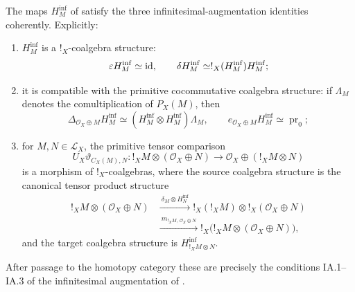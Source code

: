 \begin{proposition}
\label{prop:tangent-infinitesimal-augmentation-identities}
The maps \(H^{\inf}_M\) of
 satisfy the three
infinitesimal-augmentation identities coherently. Explicitly:
\begin{enumerate}[label=(\roman*)]
    \item \(H^{\inf}_M\) is a \(!_X\)-coalgebra structure:
    \[
        \varepsilon H^{\inf}_M\simeq\operatorname{id},
        \qquad
        \delta H^{\inf}_M
        \simeq
        !_X(H^{\inf}_M)H^{\inf}_M;
    \]

    \item it is compatible with the primitive cocommutative coalgebra structure:
    if \(\Lambda_M\) denotes the comultiplication of \(P_X(M)\), then
    \[
        \Delta_{\mathcal O_X\oplus M}H^{\inf}_M
        \simeq
        (H^{\inf}_M\otimes H^{\inf}_M)\Lambda_M,
        \qquad
        e_{\mathcal O_X\oplus M}H^{\inf}_M\simeq\operatorname{pr}_0;
    \]

    \item for \(M,N\in\mathcal L_X\), the primitive tensor comparison
    \[
        U_X\vartheta_{C_X(M),N}:
        !_XM\otimes(\mathcal O_X\oplus N)
        \longrightarrow
        \mathcal O_X\oplus(!_XM\otimes N)
    \]
    is a morphism of \(!_X\)-coalgebras, where the source coalgebra structure is
    the canonical tensor product structure
    \[
    \begin{aligned}
        !_XM\otimes(\mathcal O_X\oplus N)
        &\xrightarrow{\ \delta_M\otimes H^{\inf}_N\ }
        !_X(!_XM)\otimes !_X(\mathcal O_X\oplus N)
        \\
        &\xrightarrow{\ m_{!_XM,\,\mathcal O_X\oplus N}\ }
        !_X\bigl(!_XM\otimes(\mathcal O_X\oplus N)\bigr),
    \end{aligned}
    \]
    and the target coalgebra structure is \(H^{\inf}_{!_XM\otimes N}\).
\end{enumerate}
After passage to the homotopy category these are precisely the conditions
\textup{IA.1}--\textup{IA.3} of the infinitesimal augmentation of
\cite[Definition~10]{Lemay2021Coderelictions}.
\end{proposition}

